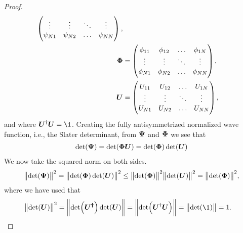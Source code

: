 \begin{proof}
\begin{align}
\begin{pmatrix}
                    \vdots & \vdots & \ddots & \vdots \\
                    \psi_{N1} & \psi_{N2} & \dots & \psi_{NN}
                \end{pmatrix}, \\
                \boldsymbol{\Phi}
                &= \begin{pmatrix}
                    \phi_{11} & \phi_{12} & \dots & \phi_{1N} \\
                    \vdots & \vdots & \ddots & \vdots \\
                    \phi_{N1} & \phi_{N2} & \dots & \phi_{NN}
                \end{pmatrix}, \\
                \boldsymbol{U}
                &= \begin{pmatrix}
                    U_{11} & U_{12} & \dots & U_{1N} \\
                    \vdots & \vdots & \ddots & \vdots \\
                    U_{N1} & U_{N2} & \dots & U_{NN}
                \end{pmatrix},
            \end{align}
            and where $\vfg{U}^{\dagger}\vfg{U} = \1$.
            Creating the fully antisymmetrized normalized wave function, i.e.,
            the Slater determinant, from $\boldsymbol{\Psi}$ and $\boldsymbol{\Phi}$ we see
            that
            \begin{gather}
                \det(\boldsymbol{\Psi}) = \det(\boldsymbol{\Phi}\boldsymbol{U})
                = \det(\boldsymbol{\Phi})\det(\boldsymbol{U})
            \end{gather}
            We now take the squared norm on both sides.
            \begin{align}
                \norm{\det(\boldsymbol{\Psi})}^2
                = \norm{\det(\boldsymbol{\Phi})\det(\boldsymbol{U})}^2
                \leq
                \norm{\det(\boldsymbol{\Phi})}^2\norm{\det(\boldsymbol{U})}^2
                = \norm{\det(\boldsymbol{\Phi})}^2,
                \label{eq:squared_determinant}
            \end{align}
            where we have used that
            \begin{align}
                \norm{\det(\vfg{U})}^2
                &= \norm{\det(\vfg{U^{\dagger}})\det(\vfg{U})}
                = \norm{\det(\vfg{U}^{\dagger}\vfg{U})}
                = \norm{\det(\1)} = 1.

\end{align}
\end{proof}
